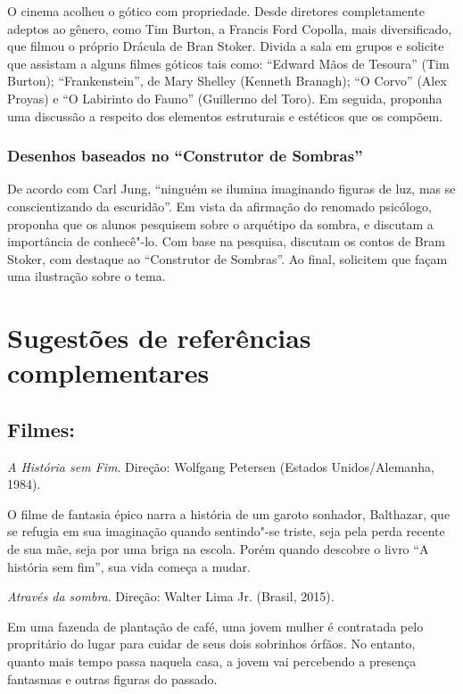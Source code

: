 \documentclass[12pt]{extarticle}
\begin{document}
O cinema acolheu o gótico com propriedade. Desde diretores
completamente adeptos ao gênero, como Tim Burton, a Francis Ford
Copolla, mais diversificado, que filmou o próprio Drácula de Bran
Stoker. Divida a sala em grupos e solicite que assistam a alguns filmes góticos
tais como: ``Edward Mãos de Tesoura'' (Tim Burton); ``Frankenstein'', de Mary
Shelley (Kenneth Branagh); ``O Corvo'' (Alex Proyas) e ``O Labirinto do
Fauno'' (Guillermo del Toro). Em seguida, proponha uma discussão a
respeito dos elementos estruturais e estéticos que os compõem.

\subsubsection{Desenhos baseados no ``Construtor de Sombras''}


De acordo com Carl Jung, ``ninguém se ilumina imaginando figuras de
luz, mas se conscientizando da escuridão''. Em vista da afirmação do
renomado psicólogo, proponha que os alunos pesquisem sobre o arquétipo
da sombra, e discutam a importância de conhecê"-lo. Com base na
pesquisa, discutam os contos de Bram Stoker, com destaque ao
``Construtor de Sombras''. Ao final, solicitem que façam uma ilustração
sobre o tema.


\section{Sugestões de referências complementares}

\subsection{Filmes:}

\textit{A História sem Fim}. Direção: Wolfgang Petersen (Estados Unidos/Alemanha, 1984).

O filme de fantasia épico narra a história de um garoto sonhador, Balthazar, que se refugia 
em sua imaginação quando sentindo"-se triste, seja pela perda recente de sua mãe, seja por 
uma briga na escola. Porém quando descobre o livro ``A história sem fim'', sua vida começa 
a mudar. 

\textit{Através da sombra}. Direção: Walter Lima Jr. (Brasil, 2015).

Em uma fazenda de plantação de café, uma jovem mulher é contratada pelo propritário do lugar para 
cuidar de seus dois sobrinhos órfãos. No entanto, quanto mais tempo passa naquela casa, a jovem vai 
percebendo a presença fantasmas e outras figuras do passado.
\end{document}
